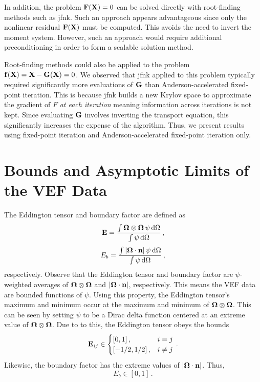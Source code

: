 \documentclass[../doc.tex]{subfiles}
\begin{document}
In addition, the problem $\boldsymbol{\mathrm{F}}(\boldsymbol{\mathrm{X}}) = 0$ can be solved directly with root-finding methods such as \gls{jfnk}. Such an approach appears advantageous since only the nonlinear residual $\boldsymbol{\mathrm{F}}(\boldsymbol{\mathrm{X}})$ must be computed. This avoids the need to invert the moment system. However, such an approach would require additional preconditioning in order to form a scalable solution method. 

Root-finding methods could also be applied to the problem $\boldsymbol{\mathrm{f}}(\boldsymbol{\mathrm{X}}) = \boldsymbol{\mathrm{X}} - \boldsymbol{\mathrm{G}}(\boldsymbol{\mathrm{X}}) = 0$. 
We observed that \gls{jfnk} applied to this problem typically required significantly more evaluations of $\boldsymbol{\mathrm{G}}$ than Anderson-accelerated fixed-point iteration. This is because \gls{jfnk} builds a new Krylov space to approximate the gradient of $F$ \emph{at each iteration} meaning information across iterations is not kept. Since evaluating $\boldsymbol{\mathrm{G}}$ involves inverting the transport equation, this significantly increases the expense of the algorithm. Thus, we present results using fixed-point iteration and Anderson-accelerated fixed-point iteration only. 

\section{Bounds and Asymptotic Limits of the VEF Data}
The Eddington tensor and boundary factor are defined as 
	\begin{equation}
		\boldsymbol{\mathrm{E}} = \frac{\int\boldsymbol{\Omega}\otimes\boldsymbol{\Omega}\,\psi \mathop{}\!\mathrm{d} \Omega}{\int \psi \mathop{}\!\mathrm{d} \Omega}\,,
	\end{equation}
	\begin{equation}
		E_b = \frac{\int|\boldsymbol{\Omega}\cdot\boldsymbol{\mathrm{n}}|\,\psi \mathop{}\!\mathrm{d} \Omega}{\int \psi \mathop{}\!\mathrm{d} \Omega} \,,
	\end{equation}
respectively. Observe that the Eddington tensor and boundary factor are $\psi$-weighted averages of $\boldsymbol{\Omega}\otimes\boldsymbol{\Omega}$ and $|\boldsymbol{\Omega}\cdot\boldsymbol{\mathrm{n}}|$, respectively. This means the VEF data are bounded functions of $\psi$. 
Using this property, the Eddington tensor's maximum and minimum occur at the maximum and minimum of $\boldsymbol{\Omega}\otimes\boldsymbol{\Omega}$. This can be seen by setting $\psi$ to be a Dirac delta function centered at an extreme value of $\boldsymbol{\Omega}\otimes\boldsymbol{\Omega}$. Due to to this, the Eddington tensor obeys the bounds 
	\begin{equation}
		\boldsymbol{\mathrm{E}}_{ij} \in \begin{cases}
			[0,1] \,, & i=j \\ 
			[-1/2,1/2] \,, & i\neq j
		\end{cases} \,. 
	\end{equation}
Likewise, the boundary factor has the extreme values of $|\boldsymbol{\Omega}\cdot\boldsymbol{\mathrm{n}}|$. Thus, 
	\begin{equation}
		E_b \in [0,1] \,. 
	\end{equation}
\end{document}
